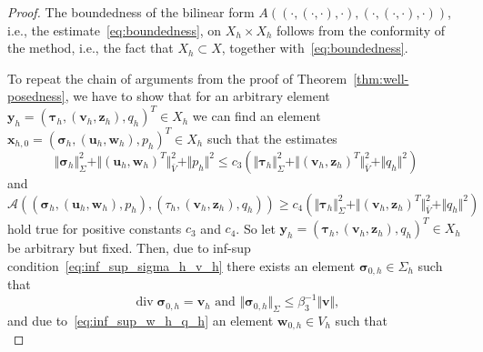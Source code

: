 \documentclass[11pt]{amsart}
\theoremstyle{remark}
\theoremstyle{definition}
\def\sig{{\bm \sigma}}
\def\bu{{\boldsymbol u}}
\def\bv{{\boldsymbol v}}
\def\bw{{\boldsymbol w}}
\def\tbx{{\bx}}
\def\tsig{\sig}
\def\tbu{{\bu}}
\def\tbw{{\bw}}
\def\tp{{p}}
\renewcommand{\div}{\operatorname{div}}
\renewcommand{\div}{\operatorname{div}}
\def\sig{\boldsymbol \sigma}
\def\bu{\boldsymbol u}
\def\bv{\boldsymbol v}
\def\bw{\boldsymbol w}
\def\bx{\boldsymbol x}
\def\by{\boldsymbol y}
\def\bz{\boldsymbol z}
\begin{document}
\begin{proof}
The boundedness of the bilinear form $A ((\cdot,(\cdot,\cdot),\cdot),(\cdot,(\cdot,\cdot),\cdot))$, i.e., the estimate~\eqref{eq:boundedness}, on $X_h \times X_h$ follows from the conformity of the method, i.e., the fact that $X_h \subset X$, together with~\eqref{eq:boundedness}.

{ To repeat the chain of arguments from the proof of Theorem~\ref{thm:well-posedness}, we have to show that for an arbitrary element $\by_h = (\bm \tau_h,(\bv_h,\bz_h),q_h)^T \in X_h$ we can find an element $\tbx_{h,0} = (\tsig_h,(\tbu_h,\tbw_h), \tp_h)^T \in X_h$ such that the estimates}
%
\begin{equation}\label{eq:boundedness_estimate_h}
\Vert \tsig_h \Vert_\Sigma^2 + \Vert (\tbu_h,\tbw_h)^T \Vert_{\bar{V}}^2 + \Vert \tp_h \Vert^2 
\le c_{3} (\Vert \bm \tau_h \Vert_\Sigma^2 + \Vert (\bv_h,\bz_h)^T \Vert_{\bar{V}}^2 + \Vert q_h \Vert^2)
\end{equation}
%
and
%
\begin{equation}\label{eq:coercivity_estimate_h}
\mathcal A ((\tsig_h,(\tbu_h,\tbw_h),\tp_h),(\tau_h,(\bv_h,\bz_h),q_h)) 
\ge c_{4} (\Vert \bm \tau_h \Vert_\Sigma^2 + \Vert (\bv_h,\bz_h)^T \Vert_{\bar{V}}^2 + \Vert q_h \Vert^2) 
\end{equation}
%
hold true for positive constants $c_{3}$ and $c_{4}$.
%
So let $\by_h = (\bm \tau_h,(\bv_h,\bz_h),q_h)^T \in X_h$ be arbitrary but fixed.
Then, due to inf-sup condition~\eqref{eq:inf_sup_sigma_h_v_h} there exists an element $\sig_{0,h} \in \Sigma_h$ such that
%
\begin{equation}\label{eq:def_sig_0}
\div \sig_{0,h} = \bv_h \mbox{ and } \Vert \sig_{0,h} \Vert_\Sigma \le \beta_{3}^{-1} \Vert \bv \Vert ,
\end{equation}
%
and due to~\eqref{eq:inf_sup_w_h_q_h}
an element $\bw_{0,h} \in V_h$ such that
%
\begin{equation}\label{eq:def_w_0}

\end{equation}
\end{proof}
\end{document}
